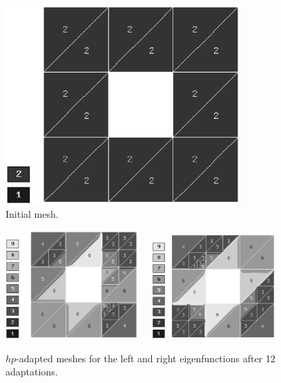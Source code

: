 \documentclass[smallextended]{svjour3}
\begin{document}
\begin{figure}[!ht]
\begin{center}
\includegraphics[width=0.8\textwidth]{hole_mesh.eps}
\end{center}
\caption{Initial mesh.}
\label{fig:hole_mesh}
\end{figure}

\begin{figure}[!ht]
\begin{center}
\includegraphics[width=0.45\textwidth]{hole_mesh1.eps}\ \ \ 
\includegraphics[width=0.42\textwidth]{hole_mesh2.eps}
\end{center}
\caption{$hp$-adapted meshes for the left and right eigenfunctions after 12 adaptations.}
\label{fig:hole_mesh_12}
\end{figure}
\end{document}
